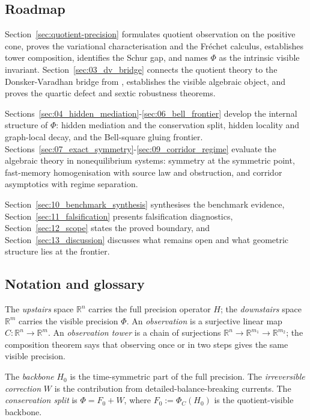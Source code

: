 \documentclass[11pt]{article}
\numberwithin{equation}{section}
\theoremstyle{thmcompact}
\theoremstyle{remark}
\begin{document}
\subsection{Roadmap}

Section~\ref{sec:quotient-precision} formulates quotient observation on the positive cone, proves the variational characterisation and the Fr\'echet calculus, establishes tower composition, identifies the Schur gap, and names $\Phi$ as the intrinsic visible invariant. Section~\ref{sec:03_dv_bridge} connects the quotient theory to the Donsker-Varadhan bridge from \cite{Dunkley2026FiniteObservation}, establishes the visible algebraic object, and proves the quartic defect and sextic robustness theorems.

Sections~\ref{sec:04_hidden_mediation}-\ref{sec:06_bell_frontier} develop the internal structure of $\Phi$: hidden mediation and the conservation split, hidden locality and graph-local decay, and the Bell-square gluing frontier. Sections~\ref{sec:07_exact_symmetry}-\ref{sec:09_corridor_regime} evaluate the algebraic theory in nonequilibrium systems: symmetry at the symmetric point, fast-memory homogenisation with source law and obstruction, and corridor asymptotics with regime separation.

Section~\ref{sec:10_benchmark_synthesis} synthesises the benchmark evidence, Section~\ref{sec:11_falsification} presents falsification diagnostics, Section~\ref{sec:12_scope} states the proved boundary, and Section~\ref{sec:13_discussion} discusses what remains open and what geometric structure lies at the frontier.

\subsection{Notation and glossary}

The \emph{upstairs} space $\mathbb{R}^n$ carries the full precision operator $H$; the \emph{downstairs} space $\mathbb{R}^m$ carries the visible precision $\Phi$. An \emph{observation} is a surjective linear map $C : \mathbb{R}^n \to \mathbb{R}^m$. An \emph{observation tower} is a chain of surjections $\mathbb{R}^n \to \mathbb{R}^{m_1} \to \mathbb{R}^{m_2}$; the composition theorem says that observing once or in two steps gives the same visible precision.

The \emph{backbone} $H_0$ is the time-symmetric part of the full precision. The \emph{irreversible correction} $W$ is the contribution from detailed-balance-breaking currents. The \emph{conservation split} is $\Phi = F_0 + W$, where $F_0 := \Phi_C(H_0)$ is the quotient-visible backbone.
\end{document}
